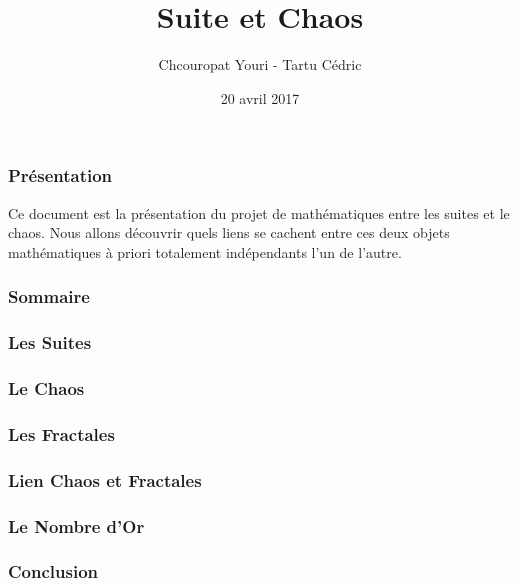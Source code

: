 \documentclass{beamer}
\title{Suite et Chaos}
\author{Chcouropat Youri - Tartu Cédric}
\institute{Brest Open Campus - EPSI}
\date{20 avril 2017}
\begin{document}
\begin{frame}
\titlepage
\end{frame}

\begin{frame}
\frametitle{Présentation}
Ce document est la présentation du projet de mathématiques entre les suites et le chaos.
Nous allons découvrir quels liens se cachent entre ces deux objets mathématiques à priori totalement indépendants l'un de l'autre.
\end{frame}

\begin{frame}
\frametitle{Sommaire}
  \tableofcontents
\end{frame}

\begin{frame}
\frametitle{Les Suites}
\end{frame}

\begin{frame}
\frametitle{Le Chaos}
\end{frame}

\begin{frame}
\frametitle{Les Fractales}
\end{frame}

\begin{frame}
\frametitle{Lien Chaos et Fractales}
\end{frame}

\begin{frame}
\frametitle{Le Nombre d'Or}
\end{frame}

\begin{frame}
\frametitle{Conclusion}
\end{frame}
\end{document}
